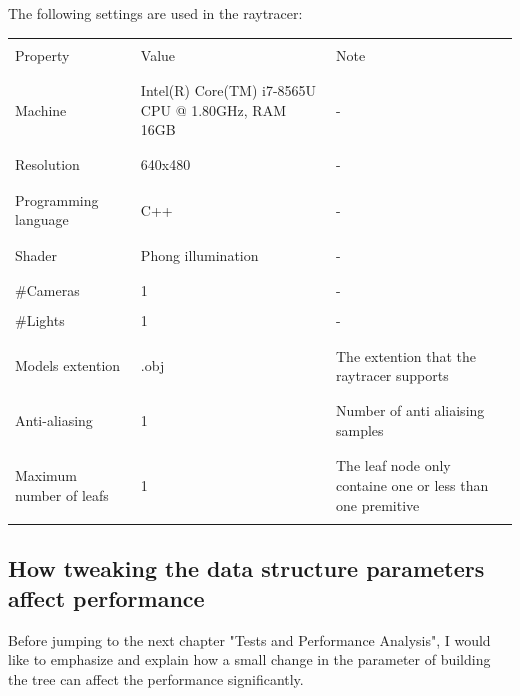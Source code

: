 \documentclass[11pt,a4paper]{article}
\begin{document}
The following settings are used in the raytracer:
\begin{table}[ht] 
\centering 
{\footnotesize
\begin{tabular}{ P{2.5cm}||P{5cm}  P{5cm}}      %
\hline \hline
\\
Property & Value & Note \\ [0.5ex]
\\
\hline \hline
\\
Machine & Intel(R) Core(TM) i7-8565U CPU @ 1.80GHz, RAM 16GB & -\\ [0.5ex] %
\\
 \hline
 \\
Resolution & 640x480 & - \\
\\
 \hline
 \\
Programming language & C++ & - \\
\\ 
 \hline
 \\
Shader & Phong illumination & - \\
\\
 \hline
 \\
\#Cameras & 1 & - \\
\\
\#Lights & 1 & - \\
\\ 
 \hline
 \\
 Models extention& .obj& The extention that the raytracer supports \\
\\ 
 \hline
 \\
Anti-aliasing & 1 & Number of anti aliaising samples\\
\\ 
 \hline
 \\
Maximum number of leafs& 1 & The leaf node only containe one or less than one premitive\\
\\
\hline \hline
    \end{tabular}
}
\end{table}

\subsection{How tweaking the data structure parameters affect performance}
Before jumping to the next chapter "Tests and Performance Analysis", I would like to emphasize and explain how a small change in the parameter of building the tree can affect the performance significantly. 
\\
\noindent
\end{document}
